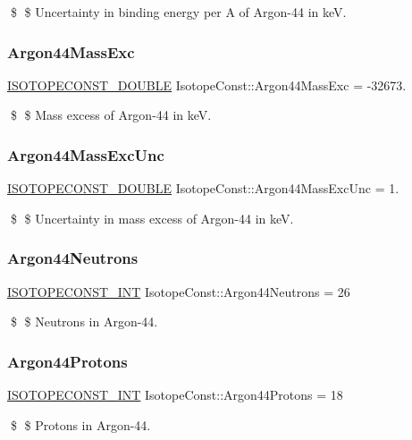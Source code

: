 \$ \$ Uncertainty in binding energy per A of Argon-\/44 in keV. \mbox{\label{group___isotope_const-_argon-_ar44_ga853bef59fab513b0fe4a681b948c10f1}} 
\subsubsection{\texorpdfstring{Argon44\+Mass\+Exc}{Argon44MassExc}}
{\footnotesize\ttfamily \mbox{\hyperlink{group___isotope_const-_macros_ga8f45a7272ce02c0b4c65c44636ed719a}{I\+S\+O\+T\+O\+P\+E\+C\+O\+N\+S\+T\+\_\+\+D\+O\+U\+B\+LE}} Isotope\+Const\+::\+Argon44\+Mass\+Exc = -\/32673.}

\$ \$ Mass excess of Argon-\/44 in keV. \mbox{\label{group___isotope_const-_argon-_ar44_ga68b415598708dcc7c0b85d2335c2300d}} 
\subsubsection{\texorpdfstring{Argon44\+Mass\+Exc\+Unc}{Argon44MassExcUnc}}
{\footnotesize\ttfamily \mbox{\hyperlink{group___isotope_const-_macros_ga8f45a7272ce02c0b4c65c44636ed719a}{I\+S\+O\+T\+O\+P\+E\+C\+O\+N\+S\+T\+\_\+\+D\+O\+U\+B\+LE}} Isotope\+Const\+::\+Argon44\+Mass\+Exc\+Unc = 1.}

\$ \$ Uncertainty in mass excess of Argon-\/44 in keV. \mbox{\label{group___isotope_const-_argon-_ar44_ga592dfec4cd1269e8ac13e68fa3ea0367}} 
\subsubsection{\texorpdfstring{Argon44\+Neutrons}{Argon44Neutrons}}
{\footnotesize\ttfamily \mbox{\hyperlink{group___isotope_const-_macros_ga5f18360b3e99483a35c32d789e62621c}{I\+S\+O\+T\+O\+P\+E\+C\+O\+N\+S\+T\+\_\+\+I\+NT}} Isotope\+Const\+::\+Argon44\+Neutrons = 26}

\$ \$ Neutrons in Argon-\/44. \mbox{\label{group___isotope_const-_argon-_ar44_gab8cbd417c50bf5a34cabc075f941e49e}} 
\subsubsection{\texorpdfstring{Argon44\+Protons}{Argon44Protons}}
{\footnotesize\ttfamily \mbox{\hyperlink{group___isotope_const-_macros_ga5f18360b3e99483a35c32d789e62621c}{I\+S\+O\+T\+O\+P\+E\+C\+O\+N\+S\+T\+\_\+\+I\+NT}} Isotope\+Const\+::\+Argon44\+Protons = 18}

\$ \$ Protons in Argon-\/44. 